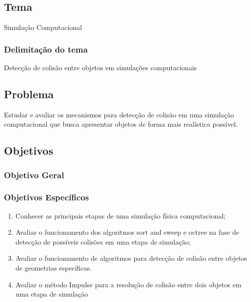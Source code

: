 \chapter*[]{}

\section{Tema}

Simulação Computacional

\subsection{Delimitação do tema}

Detecção de colisão entre objetos em simulações computacionais

\section{Problema}

 Estudar e avaliar os mecanismos para detecção de colisão em uma simulação computacional que busca apresentar objetos de forma mais realística possível.


\section{Objetivos}

\subsection{Objetivo Geral}

\subsection{Objetivos Específicos}
\begin{enumerate}
\item Conhecer as principais etapas de uma simulação física computacional;
\item Avaliar o funcionamento dos algoritmos sort and sweep e octree na fase de detecção de possíveis colisões em uma etapa de simulação;
\item Avaliar o funcionamento de algoritmos para detecção de colisão entre objetos de geometrias específicas.
\item Avaliar o método Impulse para a resolução de colisão entre dois objetos em uma etapa de simulação
\end{enumerate}

